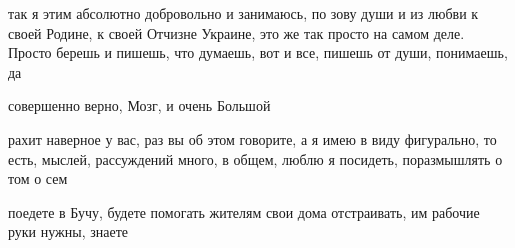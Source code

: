 так я этим абсолютно добровольно и занимаюсь, по зову души и из любви к своей
Родине, к своей Отчизне Украине, это же так просто на самом деле. Просто берешь
и пишешь, что думаешь, вот и все, пишешь от души, понимаешь, да

совершенно верно, Мозг, и очень Большой

рахит наверное у вас, раз вы об этом говорите, а я имею в виду фигурально, то
есть, мыслей, рассуждений много, в общем, люблю я посидеть, поразмышлять о том
о сем

поедете в Бучу, будете помогать жителям свои дома отстраивать, им рабочие руки
нужны, знаете




